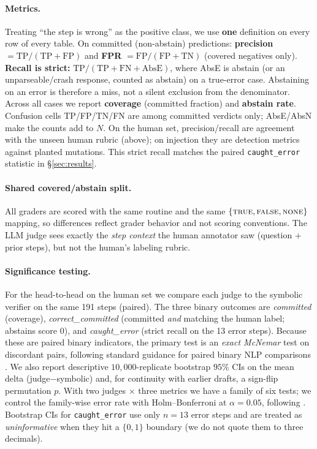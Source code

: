 \paragraph{Metrics.}
Treating ``the step is wrong'' as the positive class, we use \textbf{one}
definition on every row of every table. On committed (non-abstain) predictions:
\textbf{precision} $=\mathrm{TP}/(\mathrm{TP}+\mathrm{FP})$ and
\textbf{FPR} $=\mathrm{FP}/(\mathrm{FP}+\mathrm{TN})$ (covered negatives only).
\textbf{Recall is strict:}
$\mathrm{TP}/(\mathrm{TP}+\mathrm{FN}+\mathrm{AbsE})$, where AbsE is
abstain (or an unparseable/crash response, counted as abstain) on a true-error case.
Abstaining on an error is therefore a miss, not a silent exclusion from the
denominator. Across all cases we report \textbf{coverage} (committed fraction)
and \textbf{abstain rate}. Confusion cells TP/FP/TN/FN are among committed
verdicts only; AbsE/AbsN make the counts add to $N$. On the human set,
precision/recall are agreement with the unseen human rubric (above); on
injection they are detection metrics against planted mutations. This strict
recall matches the paired \texttt{caught\_error} statistic in
\S\ref{sec:results}.

\paragraph{Shared covered/abstain split.}
All graders are scored with the same routine and the same
$\{\textsc{true},\textsc{false},\textsc{none}\}$ mapping, so differences reflect
grader behavior and not scoring conventions. The LLM judge sees exactly the
\emph{step context} the human annotator saw (question $+$ prior steps), but not
the human's labeling rubric.

\paragraph{Significance testing.}
For the head-to-head on the human set we compare each judge to the symbolic
verifier on the same 191 steps (paired). The three binary outcomes are
\emph{committed} (coverage), \emph{correct\_committed} (committed \emph{and}
matching the human label; abstains score $0$), and \emph{caught\_error} (strict
recall on the 13 error steps). Because these are paired binary indicators, the
primary test is an \emph{exact McNemar} test \citep{mcnemar1947note} on
discordant pairs, following standard guidance for paired binary NLP comparisons
\citep{dror2018hitchhikers}. We also report descriptive $10{,}000$-replicate
bootstrap $95\%$ CIs on the mean delta (judge$-$symbolic) and, for continuity
with earlier drafts, a sign-flip permutation $p$. With two judges $\times$ three
metrics we have a family of six tests; we control the family-wise error rate with
Holm--Bonferroni \citep{holm1979simple} at $\alpha{=}0.05$, following
\citep{dror2018hitchhikers}. Bootstrap CIs
for \texttt{caught\_error} use only $n{=}13$ error steps and are treated as
\emph{uninformative} when they hit a $\{0,1\}$ boundary (we do not quote them to
three decimals).
